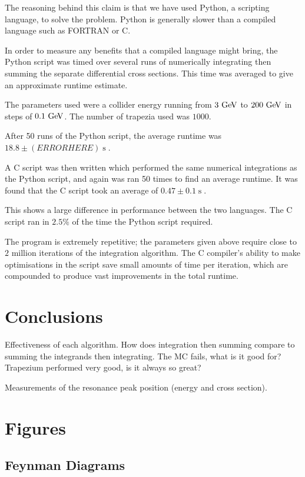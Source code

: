 \documentclass[]{article}
\begin{document}
The reasoning behind this claim is that we have used Python, a scripting language, to solve the problem. Python is generally slower than a compiled language such as FORTRAN or C.

In order to measure any benefits that a compiled language might bring, the Python script was timed over several runs of numerically integrating then summing the separate differential cross sections. This time was averaged to give an approximate runtime estimate.

The parameters used were a collider energy running from $3\GeV$ to $200\GeV$ in steps of $0.1\GeV$. The number of trapezia used was $1000$.

After 50 runs of the Python script, the average runtime was $18.8 \pm (ERRORHERE) \operatorname{s}$.

A C script was then written which performed the same numerical integrations as the Python script, and again was ran 50 times to find an average runtime. It was found that the C script took an average of $0.47 \pm 0.1 \operatorname{s}$.

This shows a large difference in performance between the two languages. The C script ran in $2.5\%$ of the time the Python script required.

The program is extremely repetitive; the parameters given above require close to $2$ million iterations of the integration algorithm. The C compiler's ability to make optimisations in the script save small amounts of time per iteration, which are compounded to produce vast improvements in the total runtime.

\section{Conclusions}\label{sec:conclusion}

Effectiveness of each algorithm. How does integration then summing compare to summing the integrands then integrating. The MC fails, what is it good for? Trapezium performed very good, is it always so great?
 

Measurements of the resonance peak position (energy and cross section).

\section{Figures}

\subsection{Feynman Diagrams}
\end{document}
